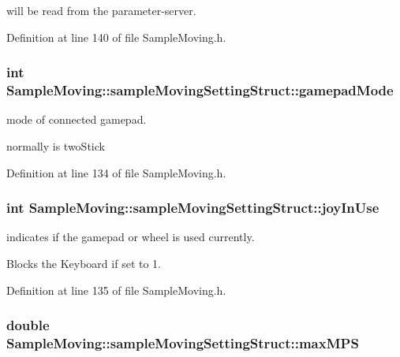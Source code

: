 will be read from the parameter-\/server. 

Definition at line 140 of file Sample\-Moving.\-h.

\hypertarget{structSampleMoving_1_1sampleMovingSettingStruct_a1b3cbdffd2c270871b009022b1f65eb0}{
\subsubsection[{gamepad\-Mode}]{\setlength{\rightskip}{0pt plus 5cm}int Sample\-Moving\-::sample\-Moving\-Setting\-Struct\-::gamepad\-Mode}}\label{structSampleMoving_1_1sampleMovingSettingStruct_a1b3cbdffd2c270871b009022b1f65eb0}


mode of connected gamepad. 

normally is two\-Stick 

Definition at line 134 of file Sample\-Moving.\-h.

\hypertarget{structSampleMoving_1_1sampleMovingSettingStruct_aa1245c04ef0560d0192ff60ef7daace8}{
\subsubsection[{joy\-In\-Use}]{\setlength{\rightskip}{0pt plus 5cm}int Sample\-Moving\-::sample\-Moving\-Setting\-Struct\-::joy\-In\-Use}}\label{structSampleMoving_1_1sampleMovingSettingStruct_aa1245c04ef0560d0192ff60ef7daace8}


indicates if the gamepad or wheel is used currently. 

Blocks the Keyboard if set to 1. 

Definition at line 135 of file Sample\-Moving.\-h.

\hypertarget{structSampleMoving_1_1sampleMovingSettingStruct_a293fb79eebdf2c0f45aa196070391c82}{
\subsubsection[{max\-M\-P\-S}]{\setlength{\rightskip}{0pt plus 5cm}double Sample\-Moving\-::sample\-Moving\-Setting\-Struct\-::max\-M\-P\-S}}\label{structSampleMoving_1_1sampleMovingSettingStruct_a293fb79eebdf2c0f45aa196070391c82}


